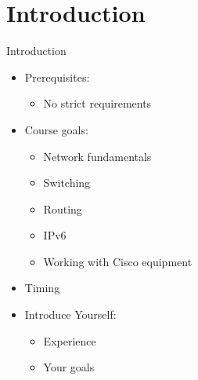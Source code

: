 \section[intro]{Introduction}

\begin{frame}{Introduction}
	\begin{itemize}[<+->]
		\item Prerequisites:
		\begin{itemize}
			\item No strict requirements
		\end{itemize}
		\item Course goals:
		\begin{itemize}
			\item Network fundamentals
			\item Switching
			\item Routing
			\item IPv6
			\item Working with Cisco equipment
		\end{itemize}
		\item Timing
		\item Introduce Yourself:
		\begin{itemize}
			\item Experience
			\item Your goals
		\end{itemize}
	\end{itemize}
\end{frame}
